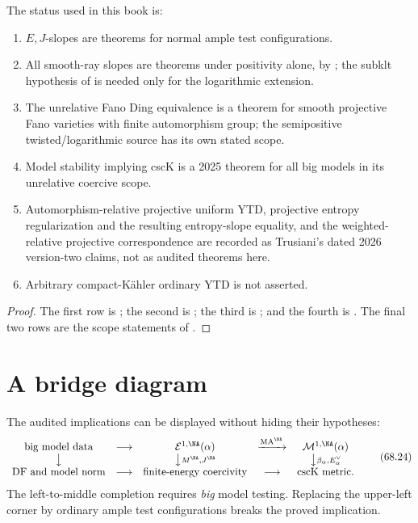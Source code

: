 \begin{proposition}\label{prop:ytd-status}
The status used in this book is:
\begin{enumerate}
\item $E,J$-slopes are theorems for normal ample test
      configurations.
\item All smooth-ray slopes are theorems under positivity alone, by
      \cite[Theorem~3.6]{BHJ19}; the subklt hypothesis of
      \cite[Theorem~4.2]{BHJ19} is needed only for the logarithmic
      extension.
\item The unrelative Fano Ding equivalence is a theorem for smooth
      projective Fano varieties with finite automorphism group; the
      semipositive twisted/logarithmic source has its own stated scope.
\item Model stability implying cscK is a 2025 theorem for all big
      models in its unrelative coercive scope.
\item Automorphism-relative projective uniform YTD, projective entropy regularization and
      the resulting entropy-slope equality, and the weighted-relative
      projective correspondence are recorded as Trusiani's dated 2026
      version-two claims, not as audited theorems here.
\item Arbitrary compact-K\"ahler ordinary YTD is not asserted.
\end{enumerate}
\par
\end{proposition}

\begin{proof}
The first row is ; the second is
; the third is
; and the fourth is
. The final two rows are the
scope statements of .
\end{proof}

\section{A bridge diagram}
\label{sec:ytd-diagram}

The audited implications can be displayed without hiding their
hypotheses:
\[
\begin{array}{ccccc}
\text{big model data}
 &\longrightarrow&
\mathcal E^{1,\NA}(\alpha)
 &\xrightarrow{\operatorname{MA}^{\NA}}&
\mathcal M^{1,\NA}(\alpha)\\
\big\downarrow
 &&
\big\downarrow{\scriptstyle M^{\NA},J^{\NA}}
 &&
\big\downarrow{\scriptstyle\beta_\alpha,E_\alpha^\vee}\\
\text{DF and model norm}
 &\longrightarrow&
\text{finite-energy coercivity}
 &\longrightarrow&
\text{cscK metric}.
\end{array}
\tag{68.24}\label{eq:ytd-audited-diagram}
\]
The left-to-middle completion requires \emph{big} model testing.
Replacing the upper-left corner by ordinary ample test configurations
breaks the proved implication.

